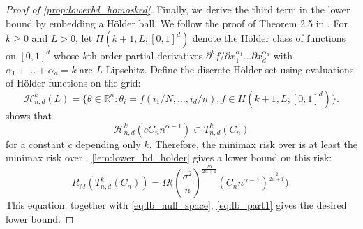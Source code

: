 \documentclass[ejs,noshowframe]{imsart}
\theoremstyle{plain}
\theoremstyle{definition}
\newcommand{\R}{\mathbb{R}}
\newcommand{\cH}{\mathcal{H}}
\newcommand{\ktvset}{T}
\begin{document}
\begin{appendix}
\begin{proof}[Proof of \autoref{prop:lowerbd_homosked}]
Finally, we derive the third term in the lower bound by embedding a H\"older ball.
We follow the proof of
Theorem 2.5 
in \cite{tsybakov2009introduction}. 
For $k\ge 0$ and $L>0$, let $H(k+1, L; [0,1]^d)$ denote the H\"older class of 
functions on $[0,1]^d$
whose $k$th order partial derivatives 
$\partial^k f / \partial x_1^{\alpha_1} \dots \partial x_d^{\alpha_d}$
with $\alpha_1 + \dots + \alpha_d = k$ are $L$-Lipschitz.
Define the discrete H\"older set using evaluations of H\"older functions on the 
grid:
\begin{equation}
	\label{eq:holder_set_discrete}
\cH_{n,d}^k(L) = \{ 
	\theta \in \R^n : \theta_i = f(i_1/N, \dots, i_d/n) , 
	f\in H(k+1, L; [0,1]^d)\}.
\end{equation}
\cite{SadhanalaWang2017} shows that
$$
\cH_{n,d}^k (c C_n n^{\alpha -1}) \subset \ktvset_{n,d}^k (C_n)
$$
for a constant $c$ depending only $k.$
Therefore, the minimax risk over \smash{$\ktvset_{n,d}^k (C_n)$} is at least the 
minimax risk over \smash{$\cH_{n,d}^k(C_n)$}. 
\autoref{lem:lower_bd_holder} gives a lower bound on this risk:
\begin{equation}
R_M( \ktvset_{n,d}^k (C_n)) = \Omega\bigg(  \left( \frac{\sigma^2}{n} 
\right)^{\frac{2\alpha}{2\alpha+1}} 
							(C_n n^{\alpha-1}) 
^{\frac{2}{2\alpha+1}}
				\bigg).
\end{equation}
This equation, together with \eqref{eq:lb_null_space}, \eqref{eq:lb_part1} 
gives the desired lower bound.
\end{proof}



\end{appendix}
\end{document}
